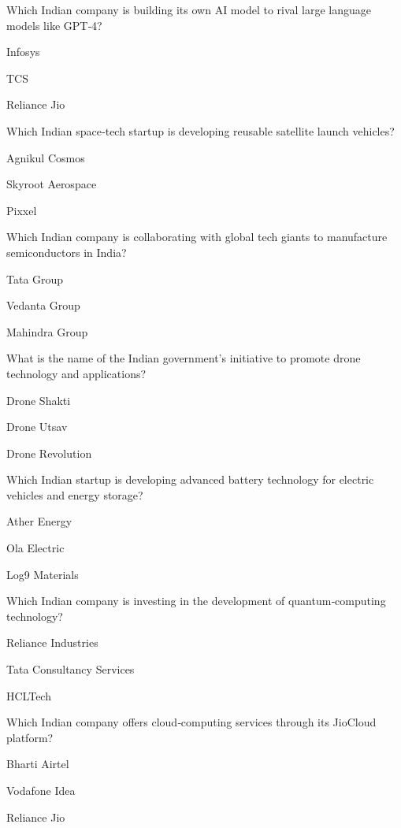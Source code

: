 \begin{enhancedmcq}{Which Indian company is building its own AI model to rival large language models like GPT‑4?}
\item Infosys
\item TCS
\item Reliance Jio

\end{enhancedmcq}
\begin{enhancedmcq}{Which Indian space‑tech startup is developing reusable satellite launch vehicles?}
\item Agnikul Cosmos
\item Skyroot Aerospace
\item Pixxel

\end{enhancedmcq}
\begin{enhancedmcq}{Which Indian company is collaborating with global tech giants to manufacture semiconductors in India?}
\item Tata Group
\item Vedanta Group
\item Mahindra Group

\end{enhancedmcq}
\begin{enhancedmcq}{What is the name of the Indian government's initiative to promote drone technology and applications?}
\item Drone Shakti
\item Drone Utsav
\item Drone Revolution

\end{enhancedmcq}
\begin{enhancedmcq}{Which Indian startup is developing advanced battery technology for electric vehicles and energy storage?}
\item Ather Energy
\item Ola Electric
\item Log9 Materials

\end{enhancedmcq}
\begin{enhancedmcq}{Which Indian company is investing in the development of quantum‑computing technology?}
\item Reliance Industries
\item Tata Consultancy Services
\item HCLTech

\end{enhancedmcq}
\begin{enhancedmcq}{Which Indian company offers cloud‑computing services through its JioCloud platform?}
\item Bharti Airtel
\item Vodafone Idea
\item Reliance Jio

\end{enhancedmcq}
